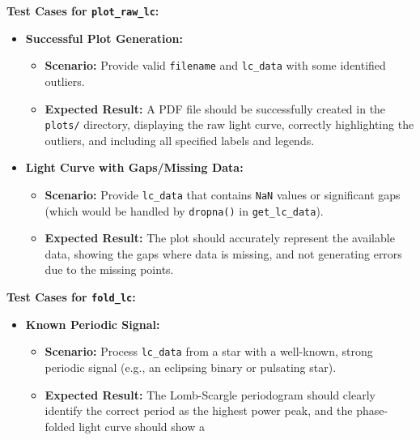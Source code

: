 \documentclass[a4paper,12pt]{article}
\DeclareRobustCommand{\bold}{\fontseries{b}\selectfont}
\newcommand{\bcode}[1]{\texttt{\fontsize{11}{13}\selectfont\bold#1}}
\newenvironment{solution}{}{}
\begin{document}
\begin{enumerate}
\begin{solution}
\begin{itemize}
            \end{itemize}
            \textbf{Test Cases for \bcode{plot\_raw\_lc}:}  
            \begin{itemize}
                \item \textbf{Successful Plot Generation:}
                \begin{itemize}
                    \item \textbf{Scenario:} Provide valid \bcode{filename} and
                    \bcode{lc\_data} with some identified outliers.
                    \item \textbf{Expected Result:} A PDF file should be
                    successfully created in the \bcode{plots/} directory,
                    displaying the raw light curve, correctly highlighting the
                    outliers, and including all specified labels and legends.
                \end{itemize}
                \item \textbf{Light Curve with Gaps/Missing Data:}
                \begin{itemize}
                    \item \textbf{Scenario:} Provide \bcode{lc\_data} that contains
                    \bcode{NaN} values or significant gaps (which would be handled
                    by \bcode{dropna()} in \bcode{get\_lc\_data}).
                    \item \textbf{Expected Result:} The plot should accurately
                    represent the available data, showing the gaps where data is
                    missing, and not generating errors due to the missing points.
                \end{itemize}
            \end{itemize}
            \textbf{Test Cases for \bcode{fold\_lc}:}
            \begin{itemize}
                \item \textbf{Known Periodic Signal:}
                \begin{itemize}
                    \item \textbf{Scenario:} Process \bcode{lc\_data} from a star
                    with a well-known, strong periodic signal (e.g., an eclipsing
                    binary or pulsating star).
                    \item \textbf{Expected Result:} The Lomb-Scargle periodogram
                    should clearly identify the correct period as the highest
                    power peak, and the phase-folded light curve should show a

\end{itemize}
\end{itemize}
\end{solution}
\end{enumerate}
\end{document}
